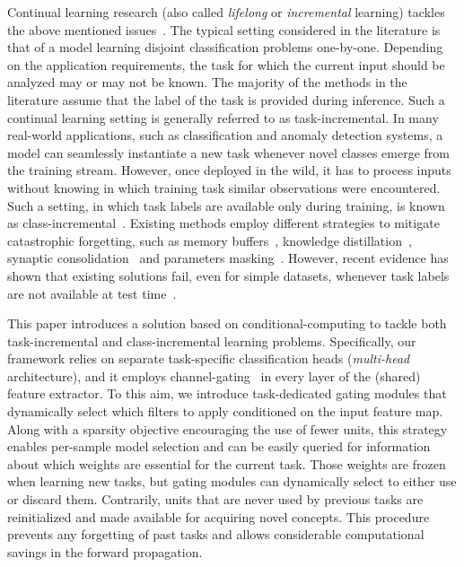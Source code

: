 \documentclass[10pt,twocolumn,letterpaper]{article}
\begin{document}
Continual learning research (also called \textit{lifelong} or \textit{incremental} learning) tackles the above mentioned issues~\cite{chen2018lifelong}.
The typical setting considered in the literature is that of a model learning disjoint classification problems one-by-one.
Depending on the application requirements, the task for which the current input should be analyzed may or may not be known. The majority of the methods in the literature assume that the label of the task is provided during inference. Such a continual learning setting is generally referred to as task-incremental. 
In many real-world applications, such as classification and anomaly detection systems, 
a model can seamlessly instantiate a new task whenever novel classes emerge from the training stream.
However, once deployed in the wild, it has to process inputs without knowing in which training task similar observations were encountered.
Such a setting, in which task labels are available only during training, 
is known as class-incremental~\cite{threescenarios}. 
Existing methods employ different strategies to mitigate catastrophic forgetting, such as memory buffers~\cite{icarl,gem}, knowledge distillation~\cite{lwf}, synaptic consolidation~\cite{ewc} and parameters masking~\cite{packnet,hat}. 
However, recent evidence has shown that existing solutions fail, even for simple datasets, whenever task labels are not available at test time~\cite{threescenarios}.

This paper introduces a solution based on conditional-computing to tackle both task-incremental and class-incremental learning problems. 
Specifically, our framework relies on separate task-specific classification heads (\textit{multi-head} architecture), and it employs channel-gating~\cite{gaternet,babak} in every layer of the (shared) feature extractor.
To this aim, we introduce task-dedicated gating modules that dynamically select which filters to apply conditioned on the input feature map. 
Along with a sparsity objective encouraging the use of fewer units, this strategy enables per-sample model selection and can be easily queried for information about which weights are essential for the current task.
Those weights are frozen when learning new tasks, but gating modules can dynamically select to either use or discard them. 
Contrarily, units that are never used by previous tasks are reinitialized and made available for acquiring novel concepts.
This procedure prevents any forgetting of past tasks and allows considerable computational savings in the forward propagation.
\end{document}
